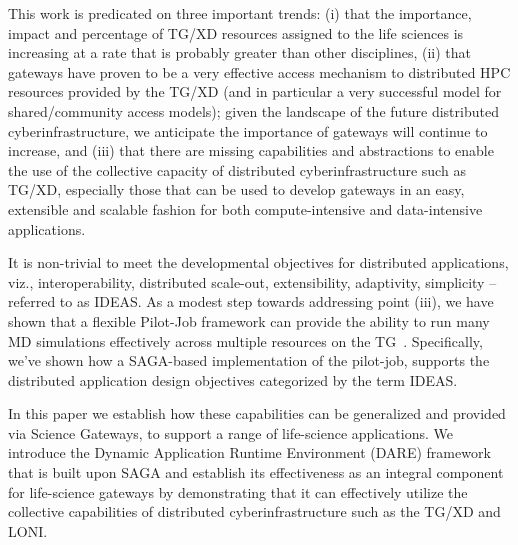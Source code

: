 \documentclass[]{article}
\begin{document}
This work is predicated on three important trends: (i) that the
importance, impact and percentage of TG/XD resources assigned to the
life sciences is increasing at a rate that is probably greater than
other disciplines, (ii) that gateways have proven to be a very
effective access mechanism to distributed HPC resources provided by
the TG/XD (and in particular a very successful model for
shared/community access models); given the landscape of the future
distributed cyberinfrastructure, we anticipate the importance of
gateways will continue to increase, and (iii) that there are missing
capabilities and abstractions to enable the use of the collective
capacity of distributed cyberinfrastructure such as TG/XD, especially
those that can be used to develop gateways in an easy, extensible and
scalable fashion for both compute-intensive and data-intensive
applications.

It is non-trivial to meet the developmental objectives for distributed
applications, viz., interoperability, distributed scale-out,
extensibility, adaptivity, simplicity -- referred to as
IDEAS\cite{ideas}.  As a modest step towards addressing point (iii),
we have shown that a flexible Pilot-Job framework can provide the
ability to run many MD simulations effectively across multiple
resources on the TG~\cite{saga-royalsoc, saga-ccgrid10}.
Specifically, we've shown how a SAGA-based implementation of the
pilot-job, supports the distributed application design objectives
categorized by the term IDEAS\cite{ideas}.

In this paper we establish how these capabilities can be generalized
and provided via Science Gateways, to support a range of life-science
applications.  We introduce the Dynamic Application Runtime Environment (DARE) framework that is built upon SAGA and
establish its effectiveness as an integral component for life-science gateways by demonstrating that it can
effectively utilize the collective capabilities of distributed cyberinfrastructure such as the TG/XD and LONI.
\end{document}
